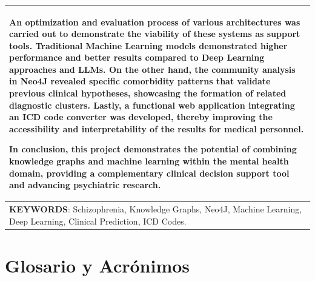 \documentclass[12pt,a4paper,onecolumn,oneside]{report}
\begin{document}
\begin{table}[H]
\begin{tabularx}{\textwidth}{|>{\raggedright\arraybackslash}X|}
    An optimization and evaluation process of various architectures was carried out to demonstrate the viability of these systems as support tools. Traditional Machine Learning models demonstrated higher performance and better results compared to Deep Learning approaches and LLMs. On the other hand, the community analysis in Neo4J revealed specific comorbidity patterns that validate previous clinical hypotheses, showcasing the formation of related diagnostic clusters. Lastly, a functional web application integrating an ICD code converter was developed, thereby improving the accessibility and interpretability of the results for medical personnel.

    In conclusion, this project demonstrates the potential of combining knowledge graphs and machine learning within the mental health domain, providing a complementary clinical decision support tool and advancing psychiatric research. \\
    \hline
    \textbf{KEYWORDS}: Schizophrenia, Knowledge Graphs, Neo4J, Machine Learning, Deep Learning, Clinical Prediction, ICD Codes. \\
    \hline
\end{tabularx}
\end{table}



\tableofcontents %
\newpage
\listoffigures %
\newpage
\listoftables %

\newpage
\chapter*{Glosario y Acrónimos}
\label{ch:glossary}
\pagestyle{mainContentStyle}
\end{document}
